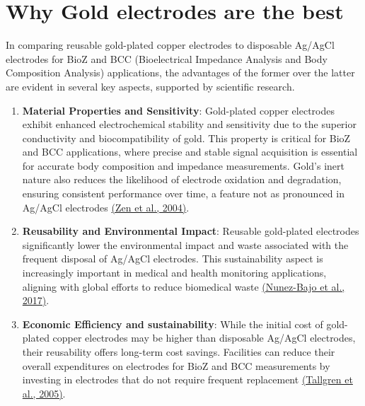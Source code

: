 \section{Why Gold electrodes are the best}
{
In comparing reusable gold-plated copper electrodes to disposable Ag/AgCl electrodes for BioZ and BCC (Bioelectrical Impedance Analysis and Body Composition Analysis) applications, the advantages of the former over the latter are evident in several key aspects, supported by scientific research.

\begin{enumerate}
    \item \textbf{Material Properties and Sensitivity}: Gold-plated copper electrodes exhibit enhanced electrochemical stability and sensitivity due to the superior conductivity and biocompatibility of gold. This property is critical for BioZ and BCC applications, where precise and stable signal acquisition is essential for accurate body composition and impedance measurements. Gold's inert nature also reduces the likelihood of electrode oxidation and degradation, ensuring consistent performance over time, a feature not as pronounced in Ag/AgCl electrodes \href{https://consensus.app/papers/amino-acid-analysis-using-copper-nanoparticle-plated-zen/95f4e51b52de5e0081608398a7922a14/?utm_source=chatgpt}{(Zen et al., 2004)}.

    \item \textbf{Reusability and Environmental Impact}: Reusable gold-plated electrodes significantly lower the environmental impact and waste associated with the frequent disposal of Ag/AgCl electrodes. This sustainability aspect is increasingly important in medical and health monitoring applications, aligning with global efforts to reduce biomedical waste \href{https://consensus.app/papers/integration-goldsputtered-paper-wireincluded-platforms-nunezbajo/6a42988eac995424b7ba7ccdeef73c27/?utm_source=chatgpt}{(Nunez-Bajo et al., 2017)}.

    \item \textbf{Economic Efficiency and sustainability}: While the initial cost of gold-plated copper electrodes may be higher than disposable Ag/AgCl electrodes, their reusability offers long-term cost savings. Facilities can reduce their overall expenditures on electrodes for BioZ and BCC measurements by investing in electrodes that do not require frequent replacement \href{https://consensus.app/papers/evaluation-commercially-electrodes-gels-recording-tallgren/f57cbd289dfc530d8783f6145a196370/?utm_source=chatgpt}{(Tallgren et al., 2005)}.


\end{enumerate}}
